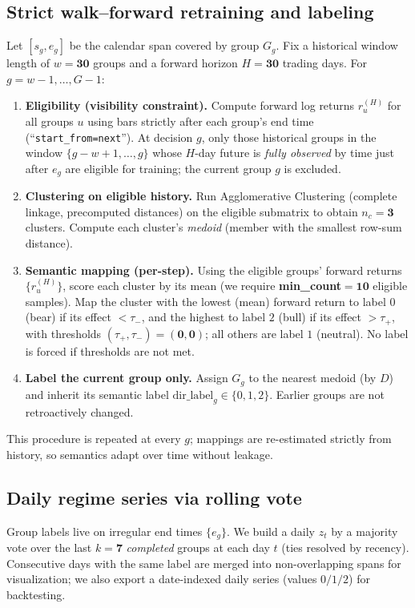 \subsection{Strict walk–forward retraining and labeling}\label{sec:wfstrict}
Let $[s_g,e_g]$ be the calendar span covered by group $G_g$. Fix a historical window length of
$w=\mathbf{30}$ groups and a forward horizon $H=\mathbf{30}$ trading days. For $g=w\!-\!1,\ldots,G\!-\!1$:
\begin{enumerate}[leftmargin=1.2em,itemsep=2pt,topsep=2pt]
\item \textbf{Eligibility (visibility constraint).}
Compute forward log returns $r^{(H)}_u$ for all groups $u$ using bars strictly after each group’s
end time (``\texttt{start\_from=next}''). At decision $g$, only those historical groups in the window
$\{g-w+1,\ldots,g\}$ whose $H$-day future is \emph{fully observed} by time just after $e_g$ are
eligible for training; the current group $g$ is excluded.
\item \textbf{Clustering on eligible history.}
Run Agglomerative Clustering (complete linkage, precomputed distances) on the eligible submatrix
to obtain $n_c=\mathbf{3}$ clusters. Compute each cluster’s \emph{medoid} (member with the smallest
row-sum distance).
\item \textbf{Semantic mapping (per-step).}
Using the eligible groups’ forward returns $\{r^{(H)}_u\}$, score each cluster by its mean
(we require \textbf{min\_count}$=\mathbf{10}$ eligible samples). Map the cluster with the lowest
(mean) forward return to label $0$ (bear) if its effect $<\tau_{-}$, and the highest to label $2$
(bull) if its effect $>\tau_{+}$, with thresholds $(\tau_{+},\tau_{-})=(\mathbf{0},\mathbf{0})$; all
others are label $1$ (neutral). No label is forced if thresholds are not met.
\item \textbf{Label the current group only.}
Assign $G_g$ to the nearest medoid (by $D$) and inherit its semantic label
$\mathrm{dir\_label}_g\in\{0,1,2\}$. Earlier groups are not retroactively changed.
\end{enumerate}
This procedure is repeated at every $g$; mappings are re-estimated strictly from history, so semantics
adapt over time without leakage.

\subsection{Daily regime series via rolling vote}\label{sec:dailyvote}
Group labels live on irregular end times $\{e_g\}$. We build a daily $z_t$ by a majority vote over the
last $k=\mathbf{7}$ \emph{completed} groups at each day $t$ (ties resolved by recency). Consecutive
days with the same label are merged into non-overlapping spans for visualization; we also export a
date-indexed daily series (values $0/1/2$) for backtesting.


